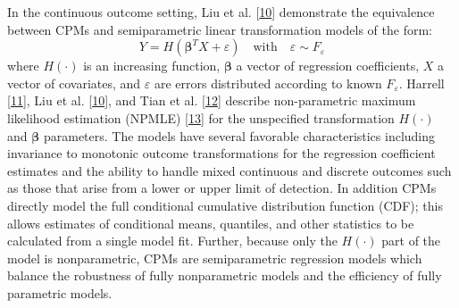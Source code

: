 \documentclass[
]{article}
\begin{document}
In the continuous outcome setting, Liu et al. {[}\protect\hyperlink{ref-liu_modeling_2017}{10}{]} demonstrate the equivalence between CPMs and semiparametric linear transformation models of the form:
\begin{equation}
Y=H(\boldsymbol{\beta}^{T}X+\varepsilon) \quad \text{with} \quad \varepsilon \sim F_{\varepsilon}
\end{equation}
where \(H(\cdot)\) is an increasing function, \(\boldsymbol{\beta}\) a vector of regression coefficients, \(X\) a vector of covariates, and \(\varepsilon\) are errors distributed according to known \(F_{\varepsilon}\). Harrell {[}\protect\hyperlink{ref-harrell_regression_2015}{11}{]}, Liu et al. {[}\protect\hyperlink{ref-liu_modeling_2017}{10}{]}, and Tian et al. {[}\protect\hyperlink{ref-tian_empirical_2019}{12}{]} describe non-parametric maximum likelihood estimation (NPMLE) {[}\protect\hyperlink{ref-zeng_maximum_2007}{13}{]} for the unspecified transformation \(H(\cdot)\) and \(\boldsymbol{\beta}\) parameters. The models have several favorable characteristics including invariance to monotonic outcome transformations for the regression coefficient estimates and the ability to handle mixed continuous and discrete outcomes such as those that arise from a lower or upper limit of detection. In addition CPMs directly model the full conditional cumulative distribution function (CDF); this allows estimates of conditional means, quantiles, and other statistics to be calculated from a single model fit. Further, because only the \(H(\cdot)\) part of the model is nonparametric, CPMs are semiparametric regression models which balance the robustness of fully nonparametric models and the efficiency of fully parametric models.
\end{document}
